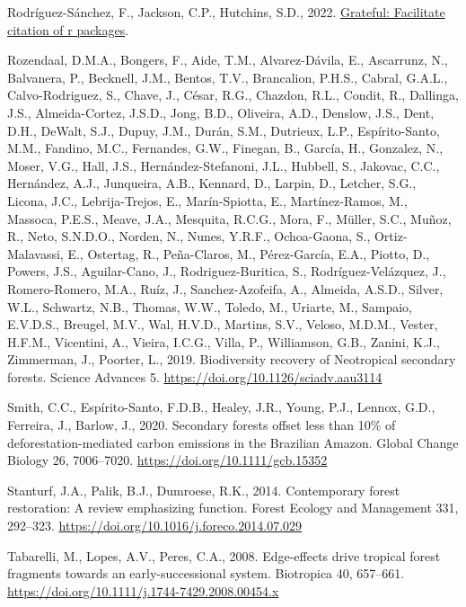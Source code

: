 \documentclass[
  12pt,
]{article}
\newlength{\cslhangindent}
\newlength{\cslentryspacingunit} %
\newenvironment{CSLReferences}[2] %
 {%
  \setlength{\parindent}{0pt}
  \ifodd #1
  \let\oldpar\par
  \def\par{\hangindent=\cslhangindent\oldpar}
  \fi
  \setlength{\parskip}{#2\cslentryspacingunit}
 }%
 {}
\begin{document}
\begin{CSLReferences}{1}{0}
\leavevmode{}%
Rodríguez-Sánchez, F., Jackson, C.P., Hutchins, S.D., 2022. \href{https://github.com/Pakillo/grateful}{Grateful: Facilitate citation of r packages}.

\leavevmode{}%
Rozendaal, D.M.A., Bongers, F., Aide, T.M., Alvarez-Dávila, E., Ascarrunz, N., Balvanera, P., Becknell, J.M., Bentos, T.V., Brancalion, P.H.S., Cabral, G.A.L., Calvo-Rodriguez, S., Chave, J., César, R.G., Chazdon, R.L., Condit, R., Dallinga, J.S., Almeida-Cortez, J.S.D., Jong, B.D., Oliveira, A.D., Denslow, J.S., Dent, D.H., DeWalt, S.J., Dupuy, J.M., Durán, S.M., Dutrieux, L.P., Espírito-Santo, M.M., Fandino, M.C., Fernandes, G.W., Finegan, B., García, H., Gonzalez, N., Moser, V.G., Hall, J.S., Hernández-Stefanoni, J.L., Hubbell, S., Jakovac, C.C., Hernández, A.J., Junqueira, A.B., Kennard, D., Larpin, D., Letcher, S.G., Licona, J.C., Lebrija-Trejos, E., Marín-Spiotta, E., Martínez-Ramos, M., Massoca, P.E.S., Meave, J.A., Mesquita, R.C.G., Mora, F., Müller, S.C., Muñoz, R., Neto, S.N.D.O., Norden, N., Nunes, Y.R.F., Ochoa-Gaona, S., Ortiz-Malavassi, E., Ostertag, R., Peña-Claros, M., Pérez-García, E.A., Piotto, D., Powers, J.S., Aguilar-Cano, J., Rodriguez-Buritica, S., Rodríguez-Velázquez, J., Romero-Romero, M.A., Ruíz, J., Sanchez-Azofeifa, A., Almeida, A.S.D., Silver, W.L., Schwartz, N.B., Thomas, W.W., Toledo, M., Uriarte, M., Sampaio, E.V.D.S., Breugel, M.V., Wal, H.V.D., Martins, S.V., Veloso, M.D.M., Vester, H.F.M., Vicentini, A., Vieira, I.C.G., Villa, P., Williamson, G.B., Zanini, K.J., Zimmerman, J., Poorter, L., 2019. Biodiversity recovery of {Neotropical} secondary forests. Science Advances 5. \url{https://doi.org/10.1126/sciadv.aau3114}

\leavevmode{}%
Smith, C.C., Espírito-Santo, F.D.B., Healey, J.R., Young, P.J., Lennox, G.D., Ferreira, J., Barlow, J., 2020. Secondary forests offset less than 10\% of deforestation-mediated carbon emissions in the {Brazilian Amazon}. Global Change Biology 26, 7006--7020. \url{https://doi.org/10.1111/gcb.15352}

\leavevmode{}%
Stanturf, J.A., Palik, B.J., Dumroese, R.K., 2014. Contemporary forest restoration: {A} review emphasizing function. Forest Ecology and Management 331, 292--323. \url{https://doi.org/10.1016/j.foreco.2014.07.029}

\leavevmode{}%
Tabarelli, M., Lopes, A.V., Peres, C.A., 2008. Edge-effects drive tropical forest fragments towards an early-successional system. Biotropica 40, 657--661. \url{https://doi.org/10.1111/j.1744-7429.2008.00454.x}


\end{CSLReferences}
\end{document}

